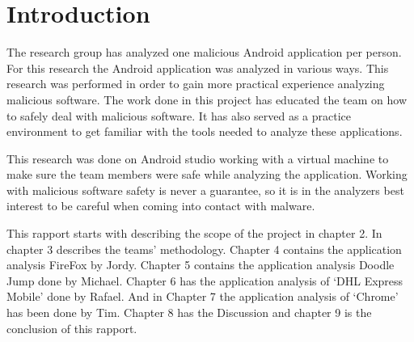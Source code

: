\section{Introduction}

The research group has analyzed one malicious Android application per person. 
For this research the Android application was analyzed in various ways. 
This research was performed in order to gain more practical experience analyzing malicious software. 
The work done in this project has educated the team on how to safely deal with malicious software. 
It has also served as a practice environment to get familiar with the tools needed to analyze these applications. 

This research was done on Android studio working with a virtual machine to make sure the team members were safe while analyzing the application. 
Working with malicious software safety is never a guarantee, so it is in the analyzers best interest to be careful when coming into contact with malware.

This rapport starts with describing the scope of the project in chapter 2. 
In chapter 3 describes the teams’ methodology. 
Chapter 4 contains the application analysis FireFox by Jordy. 
Chapter 5 contains the application analysis Doodle Jump done by Michael. 
Chapter 6 has the application analysis of ‘DHL Express Mobile’ done by Rafael. 
And in Chapter 7 the application analysis of ‘Chrome’ has been done by Tim. 
Chapter 8 has the Discussion and chapter 9 is the conclusion of this rapport.
